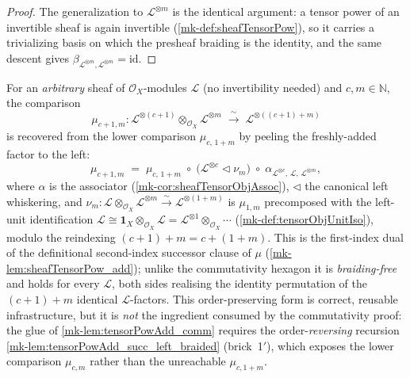 \begin{proof}
  The generalization to \(\mathcal{L}^{\otimes m}\) is the identical argument: a
  tensor power of an invertible sheaf is again invertible
  (\ref{mk-def:sheafTensorPow}), so it carries a trivializing basis on which the
  presheaf braiding is the identity, and the same descent gives
  \(\beta_{\mathcal{L}^{\otimes m},\mathcal{L}^{\otimes m}} = \mathrm{id}\).
\end{proof}

\begin{lemma}\label{mk-lem:tensorPowAdd_succ_left}
  \leanok

  For an \emph{arbitrary} sheaf of \(\mathcal{O}_X\)-modules \(\mathcal{L}\) (no
  invertibility needed) and \(c, m \in \mathbb{N}\), the comparison
  \[
    \mu_{c+1,m} : \mathcal{L}^{\otimes(c+1)} \otimes_{\mathcal{O}_X}
      \mathcal{L}^{\otimes m} \;\xrightarrow{\ \sim\ }\;
      \mathcal{L}^{\otimes((c+1)+m)}
  \]
  is recovered from the lower comparison \(\mu_{c,\,1+m}\) by peeling the
  freshly-added factor to the left:
  \[
    \mu_{c+1,m}
      \;=\;
      \mu_{c,\,1+m}
      \;\circ\;
      \bigl(\mathcal{L}^{\otimes c} \lhd \nu_m\bigr)
      \;\circ\;
      \alpha_{\mathcal{L}^{\otimes c},\,\mathcal{L},\,\mathcal{L}^{\otimes m}},
  \]
  where \(\alpha\) is the associator (\ref{mk-cor:sheafTensorObjAssoc}), \(\lhd\)
  the canonical left whiskering, and
  \(\nu_m : \mathcal{L} \otimes_{\mathcal{O}_X} \mathcal{L}^{\otimes m}
  \xrightarrow{\sim} \mathcal{L}^{\otimes(1+m)}\) is \(\mu_{1,m}\) precomposed
  with the left-unit identification \(\mathcal{L} \cong
  \mathbf{1}_X \otimes_{\mathcal{O}_X}\mathcal{L} = \mathcal{L}^{\otimes 1}
  \otimes_{\mathcal{O}_X} \cdots\) (\ref{mk-def:tensorObjUnitIso}), modulo the
  reindexing \((c+1)+m = c+(1+m)\). This is the first-index dual of the
  definitional second-index successor clause of \(\mu\)
  (\ref{mk-lem:sheafTensorPow_add}); unlike the commutativity hexagon it is
  \emph{braiding-free} and holds for every \(\mathcal{L}\), both sides realising
  the identity permutation of the \((c+1)+m\) identical \(\mathcal{L}\)-factors.
  This order-preserving form is correct, reusable infrastructure, but it is
  \emph{not} the ingredient consumed by the commutativity proof: the glue of
  \ref{mk-lem:tensorPowAdd_comm} requires the order-\emph{reversing} recursion
  \ref{mk-lem:tensorPowAdd_succ_left_braided} (brick~1\('\)), which exposes the lower
  comparison \(\mu_{c,m}\) rather than the unreachable \(\mu_{c,1+m}\).
\end{lemma}

